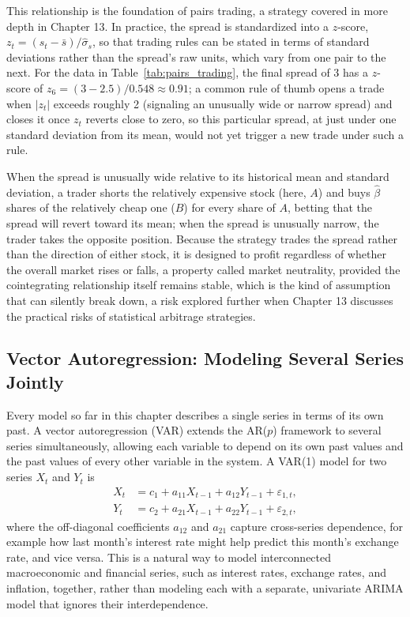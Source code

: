 \documentclass[../ai_in_finance]{subfiles}
\begin{document}
This relationship is the foundation of pairs trading, a strategy covered in more depth in Chapter 13. In practice, the spread is standardized into a $z$-score, $z_t = (s_t - \bar s)/\hat\sigma_s$, so that trading rules can be stated in terms of standard deviations rather than the spread's raw units, which vary from one pair to the next. For the data in Table~\ref{tab:pairs_trading}, the final spread of 3 has a $z$-score of $z_6 = (3 - 2.5)/0.548 \approx 0.91$; a common rule of thumb opens a trade when $|z_t|$ exceeds roughly 2 (signaling an unusually wide or narrow spread) and closes it once $z_t$ reverts close to zero, so this particular spread, at just under one standard deviation from its mean, would not yet trigger a new trade under such a rule.

When the spread is unusually wide relative to its historical mean and standard deviation, a trader shorts the relatively expensive stock (here, $A$) and buys $\hat\beta$ shares of the relatively cheap one ($B$) for every share of $A$, betting that the spread will revert toward its mean; when the spread is unusually narrow, the trader takes the opposite position.
Because the strategy trades the spread rather than the direction of either stock, it is designed to profit regardless of whether the overall market rises or falls, a property called market neutrality, provided the cointegrating relationship itself remains stable, which is the kind of assumption that can silently break down, a risk explored further when Chapter 13 discusses the practical risks of statistical arbitrage strategies.

\subsection{Vector Autoregression: Modeling Several Series Jointly}

Every model so far in this chapter describes a single series in terms of its own past. A vector autoregression (VAR) extends the AR($p$) framework to several series simultaneously, allowing each variable to depend on its own past values and the past values of every other variable in the system. A VAR(1) model for two series $X_t$ and $Y_t$ is
\begin{align*}
X_t &= c_1 + a_{11} X_{t-1} + a_{12} Y_{t-1} + \varepsilon_{1,t}, \\
Y_t &= c_2 + a_{21} X_{t-1} + a_{22} Y_{t-1} + \varepsilon_{2,t},
\end{align*}
where the off-diagonal coefficients $a_{12}$ and $a_{21}$ capture cross-series dependence, for example how last month's interest rate might help predict this month's exchange rate, and vice versa. This is a natural way to model interconnected macroeconomic and financial series, such as interest rates, exchange rates, and inflation, together, rather than modeling each with a separate, univariate ARIMA model that ignores their interdependence.
\end{document}
